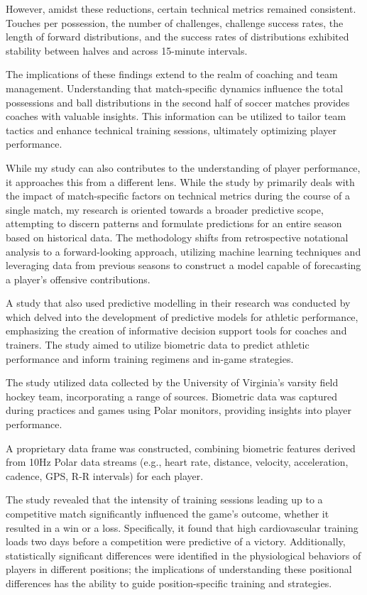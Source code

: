 \documentclass[12pt]{article}
\begin{document}
However, amidst these reductions, certain technical metrics remained consistent.
Touches per possession, the number of challenges, challenge success rates, the
length of forward distributions, and the success rates of distributions exhibited
stability between halves and across 15-minute intervals.

The implications of these findings extend to the realm of coaching and team
management. Understanding that match-specific dynamics influence the total
possessions and ball distributions in the second half of soccer matches provides
coaches with valuable insights. This information can be utilized to tailor team
tactics and enhance technical training sessions, ultimately optimizing player
performance.

While my study can also contributes to the understanding of player performance,
it approaches this from a different lens. While the study by
\citet{russell2013technical} primarily deals with the impact of match-specific
factors on technical metrics during the course of a single match, my research is
oriented towards a broader predictive scope, attempting to discern patterns and
formulate predictions for an entire season based on historical data. 
The methodology shifts from retrospective notational analysis to a
forward-looking approach, utilizing machine learning techniques and leveraging
data from previous seasons to construct a model capable of forecasting a
player's offensive contributions.



A study that also used predictive modelling in their research was conducted by
\citet{blanchfield2019developing} which delved into the development of predictive
models for athletic performance, emphasizing the creation of informative decision
support tools for coaches and trainers.
The study aimed to utilize biometric data to predict athletic performance and
inform training regimens and in-game strategies.

The study utilized data collected by the University of Virginia's varsity field
hockey team, incorporating a range of sources.
Biometric data was captured during practices and games using Polar monitors,
providing insights into player performance.

A proprietary data frame was constructed, combining biometric features derived 
from 10Hz Polar data streams (e.g., heart rate, distance, velocity, acceleration,
cadence, GPS, R-R intervals) for each player.

The study revealed that the intensity of training sessions leading up to a
competitive match significantly influenced the game's outcome, whether it
resulted in a win or a loss.
Specifically, it found that high cardiovascular training loads two days before a 
competition were predictive of a victory.
Additionally, statistically significant differences were identified in the
physiological behaviors of players in different positions; the implications of
understanding these positional differences has the ability to guide
position-specific training and strategies.
\end{document}
